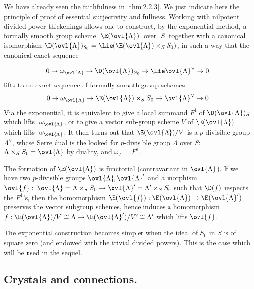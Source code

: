  We have already seen the faithfulness in \ref{thm:2.2.3}.  We just
 indicate here 
 the principle of proof of essential surjectivity and fullness. Working
 with nilpotent divided power thickenings allows one to construct, by
 the exponential method, a formally smooth group scheme
 $\;\E(\ovl{\Lambda})\;$ over $\;S\;$ together with a canonical
 isomorphism
 ${\D}(\ovl{\Lambda})_{S_0}=\Lie (\E(\ovl{\Lambda})\times_S{S_0})$, in
 such a way that the canonical exact sequence

 \begin{equation*}
  0\rightarrow \omega_{\ovl{\Lambda}}\rightarrow
   {\D}(\ovl{\Lambda})_{S_0}\rightarrow 
   \Lie \ovl{\Lambda}^\vee\rightarrow 0
 \end{equation*}
 lifts to an exact sequence of formally smooth group schemes
 \begin{equation*}
  0\rightarrow \omega_{\ovl{\Lambda}}\rightarrow
   \E(\ovl{\Lambda})\times_S{S_0}\rightarrow \ovl{\Lambda}^\vee\rightarrow 0
 \end{equation*}
 Via the exponential, it is equivalent to give a local summand $F^1$ of
 ${\D}(\ovl{\Lambda})_S$ which lifts
 $\;\omega_{\ovl{\Lambda}}$, or to give a vector sub-group scheme $V$ of
 $\E(\ovl{\Lambda})$ which lifts $\;\omega_{\ovl{\Lambda}}$. It then
 turns out that $\E(\ovl{\Lambda})/V$ is a 
 $p$-divisible group $\Lambda^\vee$, whose Serre dual is the looked for 
 $p$-divisible group $\Lambda$ over $S$: 
 $\Lambda\times_S S_0=\ovl{\Lambda}$ by duality, and $\omega_{\Lambda}=F^1$.
 

 The formation of $\E(\ovl{\Lambda})$ is functorial (contravariant in 
 $\ovl{\Lambda}$). If we have two $p$-divisible groups $\ovl{\Lambda}, 
 \ovl{\Lambda}'$ and a morphism $\ovl{f}:\;\ovl{\Lambda}=\Lambda\times_S 
 S_0\rightarrow \ovl{\Lambda}'=\Lambda'\times_S S_0$ such that 
 $\D(f)$ respects the $F^1$'s, then the homomorphism 
 $\E(\ovl{f}): \E(\ovl{\Lambda})\rightarrow \E(\ovl{\Lambda}')$ 
 preserves the vector subgroup schemes, hence induces a homomorphism 
 $f: \E(\ovl{\Lambda})/V\cong \Lambda\rightarrow 
 \E(\ovl{\Lambda}')/V'\cong\Lambda'$ which lifts $\ovl{f}$.


 The exponential construction becomes simpler when the ideal of $S_0$ in
 $S$ is of square zero (and endowed with the trivial divided
 powers). This is the case which will be used in the sequel.

\subsection{Crystals and connections.}\label{sub:3.4} 

